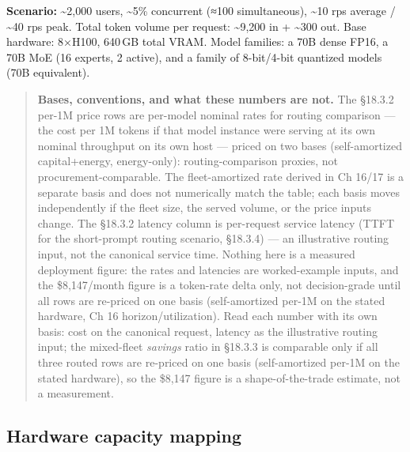 \label{worked-example}


\textbf{Scenario:} \textasciitilde2,000 users, \textasciitilde5\%
concurrent (≈100 simultaneous), \textasciitilde10 rps average /
\textasciitilde40 rps peak. Total token volume per request:
\textasciitilde9,200 in + \textasciitilde300 out. Base hardware: 8×H100,
640\,GB total VRAM. Model families: a 70B dense FP16, a 70B MoE (16
experts, 2 active), and a family of 8-bit/4-bit quantized models (70B
equivalent).

\begin{quote}
\textbf{Bases, conventions, and what these numbers are not.} The §18.3.2
per-1M price rows are per-model nominal rates for routing comparison ---
the cost per 1M tokens if that model instance were serving at its own
nominal throughput on its own host --- priced on two bases
(self-amortized capital+energy, energy-only): routing-comparison
proxies, not procurement-comparable. The fleet-amortized rate derived in
Ch 16/17 is a separate basis and does not numerically match the table;
each basis moves independently if the fleet size, the served volume, or
the price inputs change. The §18.3.2 latency column is per-request
service latency (TTFT for the short-prompt routing scenario, §18.3.4)
--- an illustrative routing input, not the canonical service time.
Nothing here is a measured deployment figure: the rates and latencies
are worked-example inputs, and the \$8,147/month figure is a token-rate
delta only, not decision-grade until all rows are re-priced on one basis
(self-amortized per-1M on the stated hardware, Ch 16
horizon/utilization). Read each number with its own basis: cost on the
canonical request, latency as the illustrative routing input; the
mixed-fleet \emph{savings} ratio in §18.3.3 is comparable only if all
three routed rows are re-priced on one basis (self-amortized per-1M on
the stated hardware), so the \$8,147 figure is a shape-of-the-trade
estimate, not a measurement.
\end{quote}

\subsection{Hardware capacity mapping}\label{hardware-capacity-mapping}

